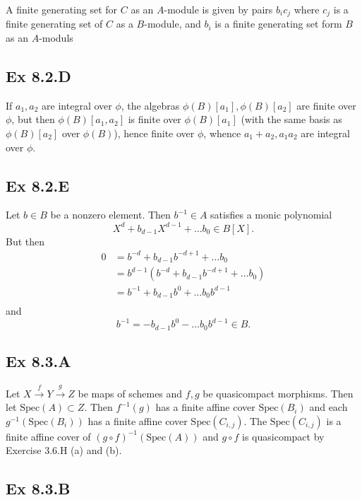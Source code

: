 \documentclass{article}
\theoremstyle{definition}
\newcommand{\Spec}{\text{Spec}}
\begin{document}
A finite generating set for $C$ as an $A$-module is given by pairs $b_ic_j$
where $c_j$ is a finite generating set of $C$ as a $B$-module, and $b_i$ is a
finite generating set form $B$ as an $A$-moduls

\subsection*{Ex 8.2.D}

If $a_{1}, a_{2}$ are integral over $\phi$, the algebras $\phi(B)[a_{1}],
	\phi(B)[a_{2}]$ are finite over $\phi$, but then $\phi(B)[a_{1}, a_{2}]$ is
finite over $\phi(B)[a_{1}]$ (with the same basis as $\phi(B)[a_{2}]$ over
	$\phi(B)$), hence finite over $\phi$, whence $a_{1} + a_{2}, a_{1}a_{2}$ are
	integral over $\phi$.

	\subsection*{Ex 8.2.E}

	Let $b \in B$ be a nonzero element. Then $b^{-1} \in A$ satisfies
	a monic polynomial
	\[
		X^{d} + b_{d - 1} X^{d - 1} + \ldots b_{0} \in B[X].
	\]
	But then
	\begin{align*}
		0
		 & =
		b^{-d} + b_{d - 1} b^{-d + 1} + \ldots b_{0}            \\
		 & =
		b^{d - 1}(b^{-d} + b_{d - 1} b^{-d + 1} + \ldots b_{0}) \\
		 & =
		b^{-1} + b_{d - 1} b^{0} + \ldots b_{0}b^{d - 1}        \\
	\end{align*}
	and
	\[
		b^{-1}
		=
		- b_{d - 1} b^{0} - \ldots b_{0}b^{d - 1}
		\in B.
	\]

	\subsection*{Ex 8.3.A}

	Let $X \xrightarrow{f} Y \xrightarrow{g} Z$ be maps of schemes and $f, g$ be
	quasicompact morphisms. Then let $\Spec(A) \subset Z$. Then $f^{-1}(g)$ has a
	finite affine cover $\Spec(B_i)$ and each $g^{-1}(\Spec(B_i))$ has a finite
	affine cover $\Spec(C_{i, j})$. The $\Spec(C_{i, j})$ is a finite affine cover
	of $(g \circ f)^{-1}(\Spec(A))$ and $g \circ f$ is quasicompact by Exercise
	3.6.H (a) and (b).

	\subsection*{Ex 8.3.B}
\end{document}
